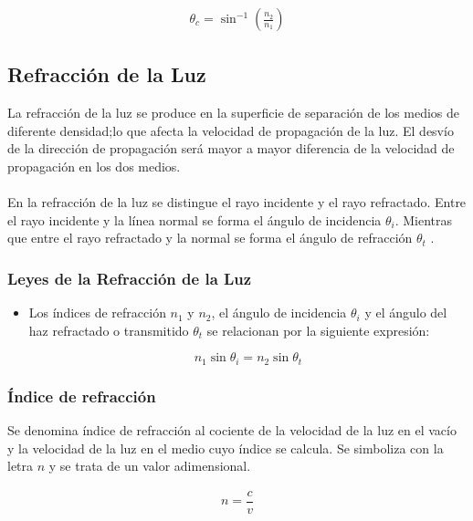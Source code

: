 \documentclass[
aps,
reprint,
amsmath, amssymb,
superscriptaddress,
]{revtex4-2}
\begin{document}
\begin{align*}
    \theta_{c} = \sin^{-1}\left(\frac{n_{2}}{n_{1}}\right)
\end{align*}


\subsection{Refracción de la Luz}

La refracción de la luz se produce en la superficie de separación de los medios de diferente densidad;lo que afecta la velocidad de propagación de la luz. El desvío de la dirección de propagación será mayor a mayor diferencia de la velocidad de propagación en los dos medios.\\
\\
En la refracción de la luz se distingue el rayo incidente y el rayo refractado. Entre el rayo incidente y la línea normal se forma el ángulo de incidencia $\theta_i$. Mientras que entre el rayo refractado y la normal se forma el ángulo de refracción $\theta_t$ \cite{optics}.\\


\subsubsection{Leyes de la Refracción de la Luz}

\begin{itemize}
    \item Los índices de refracción $n_1$ y $n_2$, el ángulo de incidencia $\theta_{i}$ y el ángulo del haz refractado o transmitido $\theta_{t}$ se relacionan por la siguiente expresión:
    
    \begin{equation}
        \label{eqn:ley_snell}
        n_{1} \sin{\theta_{i}} = n_{2} \sin{\theta_{t}} 
    \end{equation}
\end{itemize}

\subsubsection{Índice de refracción}

Se denomina índice de refracción al cociente de la velocidad de la luz en el vacío y la velocidad de la luz en el medio cuyo índice se calcula. Se simboliza con la letra $n$ y se trata de un valor adimensional.

\begin{align}
\label{eqn:indice_r}
    n = \dfrac{c}{v}
\end{align}
\end{document}
